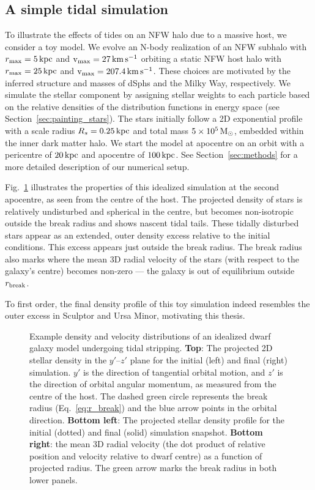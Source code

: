 \subsection{A simple tidal simulation}\label{a-simple-tidal-simulation}

To illustrate the effects of tides on an NFW halo due to a massive host,
we consider a toy model. We evolve an N-body realization of an NFW
subhalo with \(r_{\rm max}=5\,{\rm kpc}\) and \({\rm v}_{\rm max} = 27\,{\rm km\,s^{-1}}\) orbiting a
static NFW host halo with \(r_{\rm max}=25\,{\rm kpc}\) and
\({\rm v}_{\rm max} = 207.4\,{\rm km\,s^{-1}}\). These choices are motivated by the inferred
structure and masses of dSphs and the Milky Way, respectively. We
simulate the stellar component by assigning stellar weights to each
particle based on the relative densities of the distribution functions
in energy space (see Section~\ref{sec:painting_stars}). The stars
initially follow a 2D exponential profile with a scale radius
\(R_s=0.25\,{\rm kpc}\) and total mass \(5\times10^5\,{\rm M}_{\odot}\), embedded within
the inner dark matter halo. We start the model at apocentre on an orbit
with a pericentre of \(20\,{\rm kpc}\) and apocentre of \(100\,{\rm kpc}\). See
Section~\ref{sec:methods} for a more detailed description of our
numerical setup.

Fig.~\ref{fig:idealized_break_radius} illustrates the properties of this
idealized simulation at the second apocentre, as seen from the centre of
the host. The projected density of stars is relatively undisturbed and
spherical in the centre, but becomes non-isotropic outside the break
radius and shows nascent tidal tails. These tidally disturbed stars
appear as an extended, outer density excess relative to the initial
conditions. This excess appears just outside the break radius. The break
radius also marks where the mean 3D radial velocity of the stars (with
respect to the galaxy's centre) becomes non-zero --- the galaxy is out
of equilibrium outside \(r_{\rm break}\).

To first order, the final density profile of this toy simulation indeed
resembles the outer excess in Sculptor and Ursa Minor, motivating this
thesis.

\begin{figure}
\centering
{}
\caption[Example tidal simulation]{Example density and velocity
distributions of an idealized dwarf galaxy model undergoing tidal
stripping. \textbf{Top}: The projected 2D stellar density in the
\(y'\)--\(z'\) plane for the initial (left) and final (right)
simulation. \(y'\) is the direction of tangential orbital motion, and
\(z'\) is the direction of orbital angular momentum, as measured from
the centre of the host. The dashed green circle represents the break
radius (Eq.~\ref{eq:r_break}) and the blue arrow points in the orbital
direction. \textbf{Bottom left}: The projected stellar density profile
for the initial (dotted) and final (solid) simulation snapshot.
\textbf{Bottom right}: the mean 3D radial velocity (the dot product of
relative position and velocity relative to dwarf centre) as a function
of projected radius. The green arrow marks the break radius in both
lower panels.}\label{fig:idealized_break_radius}
\end{figure}

